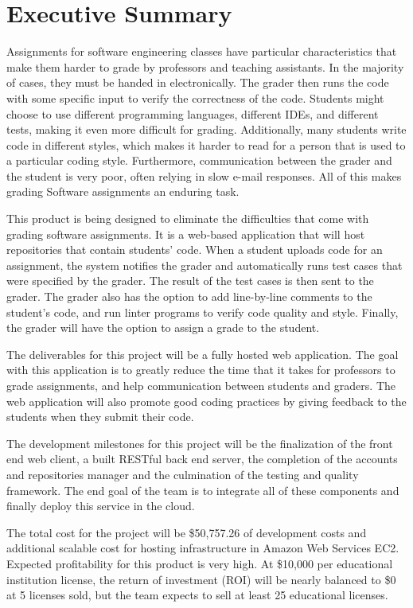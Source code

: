 \part*{Executive Summary}

Assignments for software engineering classes have particular characteristics
that make them harder to grade by professors and teaching assistants. In the
majority of cases, they must be handed in electronically. The grader then runs
the code with some specific input to verify the correctness of the code.
Students might choose to use different programming languages, different IDEs,
and different tests, making it even more difficult for grading. Additionally,
many students write code in different styles, which makes it harder to read for
a person that is used to a particular coding style. Furthermore, communication
between the grader and the student is very poor, often relying in slow e-mail
responses.  All of this makes grading Software assignments an enduring task.

This product is being designed to eliminate the difficulties that come with
grading software assignments. It is a web-based application that will
host repositories that contain students' code. When a student uploads code
for an assignment, the system notifies the grader and automatically runs test
cases that were specified by the grader. The result of the test cases is then
sent to the grader. The grader also has the option to add line-by-line comments
to the student's code, and run linter programs to verify code quality and
style. Finally, the grader will have the option to assign a grade to the
student.

The deliverables for this project will be a fully hosted web application. The
goal with this application is to greatly reduce the time that it takes for
professors to grade assignments, and help communication between students and
graders. The web application will also promote good coding practices by giving
feedback to the students when they submit their code.

The development milestones for this project will be the finalization of the
front end web client, a built RESTful back end server, the completion of the
accounts and repositories manager and the culmination of the testing and quality
framework. The end goal of the team is to integrate all of these components and finally
deploy this service in the cloud.


The total cost for the project will be \$50,757.26 of development costs and
additional scalable cost for hosting infrastructure in Amazon Web Services EC2.
Expected profitability for this product is very high. At \$10,000 per
educational institution license, the return of investment (ROI) will be nearly
balanced to \$0 at 5 licenses sold, but the team expects to sell at least 25
educational licenses.
